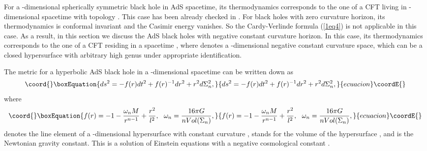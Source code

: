\documentclass[a4paper,12pt]{article}
\begin{document}
For a \coordHE{}-dimensional spherically symmetric black hole in AdS spacetime,
its thermodynamics corresponds to the one of a CFT living in 
\coordHE{}-dimensional
spacetime with topology \coordHE{}. This case has been already checked
in \cite{Verl}. For black holes with zero curvature horizon, its 
thermodynamics is conformal invariant and the Casimir energy vanishes.
So the Cardy-Verlinde formula (\ref{1eq4}) is not applicable in this case.
As a result, in this section we discuss the AdS black holes with negative 
constant curvature horizon.  In this case, its thermodynamics corresponds
to the one of a CFT residing in a spacetime \coordHE{}, where
\coordHE{} denotes a \coordHE{}-dimensional negative constant curvature space, 
which can be a closed hypersurface with arbitrary high genus under 
appropriate identification. 


The metric for a hyperbolic AdS black hole in a \coordHE{}-dimensional spacetime
can be written down as \cite{Birm}
\begin{equation}\coord{}\boxEquation{
\label{2eq1}
ds^2 = -f(r)dt^2 +f(r)^{-1}dr^2 +r^2 d\Sigma^2_n,
}{
ds^2 = -f(r)dt^2 +f(r)^{-1}dr^2 +r^2 d\Sigma^2_n,
}{ecuacion}\coordE{}\end{equation}
where
\begin{equation}\coord{}\boxEquation{
f(r) =-1 -\frac{\omega_n M}{r^{n-1}} +\frac{r^2}{l^2}, \ \  
\omega_n=\frac{16\pi G}{n Vol(\Sigma_n)},
}{
f(r) =-1 -\frac{\omega_n M}{r^{n-1}} +\frac{r^2}{l^2}, \ \  
\omega_n=\frac{16\pi G}{n Vol(\Sigma_n)},
}{ecuacion}\coordE{}\end{equation}
\myHighlight{$d\Sigma_n^2$}\coordHE{} denotes the line element of a \coordHE{}-dimensional hypersurface
with constant curvature \coordHE{},  \coordHE{} stands for the volume
of the hypersurface \myHighlight{$\Sigma_n$}\coordHE{}, and \myHighlight{$G$}\coordHE{} is the Newtonian gravity constant.
This is a solution of Einstein equations with a negative cosmological 
constant \myHighlight{$\Lambda = -n(n+1)/2l^2$}\coordHE{}. 
 
\end{document}
